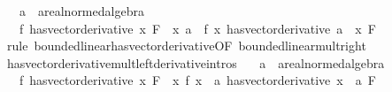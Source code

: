 \begin{isabellebody}
\ \ \ a\ {\isacharcolon}{\kern0pt}{\isacharcolon}{\kern0pt}\ {\isachardoublequoteopen}{\isacharprime}{\kern0pt}a{\isacharcolon}{\kern0pt}{\isacharcolon}{\kern0pt}real{\isacharunderscore}{\kern0pt}normed{\isacharunderscore}{\kern0pt}algebra{\isachardoublequoteclose}\isanewline
\ \ \ {\isachardoublequoteopen}{\isacharparenleft}{\kern0pt}f\ has{\isacharunderscore}{\kern0pt}vector{\isacharunderscore}{\kern0pt}derivative\ x{\isacharparenright}{\kern0pt}\ F\ {\isasymLongrightarrow}\ {\isacharparenleft}{\kern0pt}{\isacharparenleft}{\kern0pt}{\isasymlambda}x{\isachardot}{\kern0pt}\ a\ {\isacharasterisk}{\kern0pt}\ f\ x{\isacharparenright}{\kern0pt}\ has{\isacharunderscore}{\kern0pt}vector{\isacharunderscore}{\kern0pt}derivative\ {\isacharparenleft}{\kern0pt}a\ {\isacharasterisk}{\kern0pt}\ x{\isacharparenright}{\kern0pt}{\isacharparenright}{\kern0pt}\ F{\isachardoublequoteclose}\isanewline
%
\isadelimproof
\ \ %
\endisadelimproof
%
\isatagproof
{}\isamarkupfalse%
\ {\isacharparenleft}{\kern0pt}rule\ bounded{\isacharunderscore}{\kern0pt}linear{\isachardot}{\kern0pt}has{\isacharunderscore}{\kern0pt}vector{\isacharunderscore}{\kern0pt}derivative{\isacharbrackleft}{\kern0pt}OF\ bounded{\isacharunderscore}{\kern0pt}linear{\isacharunderscore}{\kern0pt}mult{\isacharunderscore}{\kern0pt}right{\isacharbrackright}{\kern0pt}{\isacharparenright}{\kern0pt}%
\endisatagproof
{\isafoldproof}%
%
\isadelimproof
\isanewline
%
\endisadelimproof
\isanewline
{}\isamarkupfalse%
\ has{\isacharunderscore}{\kern0pt}vector{\isacharunderscore}{\kern0pt}derivative{\isacharunderscore}{\kern0pt}mult{\isacharunderscore}{\kern0pt}left{\isacharbrackleft}{\kern0pt}derivative{\isacharunderscore}{\kern0pt}intros{\isacharbrackright}{\kern0pt}{\isacharcolon}{\kern0pt}\isanewline
\ \ \ a\ {\isacharcolon}{\kern0pt}{\isacharcolon}{\kern0pt}\ {\isachardoublequoteopen}{\isacharprime}{\kern0pt}a{\isacharcolon}{\kern0pt}{\isacharcolon}{\kern0pt}real{\isacharunderscore}{\kern0pt}normed{\isacharunderscore}{\kern0pt}algebra{\isachardoublequoteclose}\isanewline
\ \ \ {\isachardoublequoteopen}{\isacharparenleft}{\kern0pt}f\ has{\isacharunderscore}{\kern0pt}vector{\isacharunderscore}{\kern0pt}derivative\ x{\isacharparenright}{\kern0pt}\ F\ {\isasymLongrightarrow}\ {\isacharparenleft}{\kern0pt}{\isacharparenleft}{\kern0pt}{\isasymlambda}x{\isachardot}{\kern0pt}\ f\ x\ {\isacharasterisk}{\kern0pt}\ a{\isacharparenright}{\kern0pt}\ has{\isacharunderscore}{\kern0pt}vector{\isacharunderscore}{\kern0pt}derivative\ {\isacharparenleft}{\kern0pt}x\ {\isacharasterisk}{\kern0pt}\ a{\isacharparenright}{\kern0pt}{\isacharparenright}{\kern0pt}\ F{\isachardoublequoteclose}\isanewline

\end{isabellebody}

